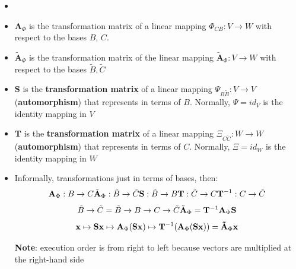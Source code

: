 \begin{itemize}
    \begin{itemize}
        \item[] 

        \item $\mathbf{A}_\Phi$ is the transformation matrix of a linear mapping $\Phi_{CB} : V \to W$ with respect to the bases $B$, $C$.

        \item $\tilde{\mathbf{A}}_\Phi$ is the transformation matrix of the linear mapping $\tilde{\mathbf{A}}_\Phi : V \to W$ with respect to the bases $\tilde{B}, \tilde{C}$ 

        \item $\mathbf{S}$ is the \textbf{transformation matrix} of a linear mapping $\Psi_{B\tilde{B}} : V \to V$ (\textbf{automorphism}) that represents  in terms of $B$. Normally, $\Psi = id_V$ is the identity mapping in $V$

        \item $\mathbf{T}$ is the \textbf{transformation matrix} of a linear mapping $\Xi_{C\tilde{C}} : W \to W$ (\textbf{automorphism}) that represents  in terms of $C$. Normally, $\Xi = id_W$ is the identity mapping in $W$

        \item Informally, transformations just in terms of bases, then:
        \[
            \hfill
            \mathbf{A}_\Phi : B \to C
            \hfill
            \tilde{\mathbf{A}}_\Phi : \tilde{B} \to \tilde{C}
            \hfill
            \mathbf{S} : \tilde{B} \to B
            \hfill
            \mathbf{T} : \tilde{C}  \to C
            \hfill
            \mathbf{T}^{-1}: C \to \tilde{C}
            \hfill
        \]
        \[
            \hfill
            \tilde{B} \to \tilde{C}
            =
            \tilde{B} \to B \to C \to \tilde{C}
            \hfill 
            \tilde{\mathbf{A}}_\Phi = \mathbf{T}^{-1}\mathbf{A}_\Phi \mathbf{S}
            \hfill
        \]
        \[
            \hfill
            \mathbf{x} 
            \mapsto \mathbf{Sx}
            \mapsto \mathbf{A}_\Phi(\mathbf{Sx})
            \mapsto \mathbf{T}^{-1}(\mathbf{A}_\Phi(\mathbf{Sx}))
            = \mathbf{\tilde{A}}_\Phi \mathbf{x}
            \hfill
        \]

        \textbf{Note}: execution order is from right to left because vectors are multiplied at the right-hand side 
        
    \end{itemize}
    
\end{itemize}



